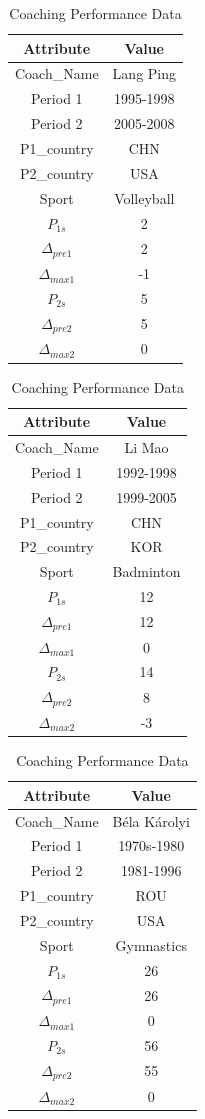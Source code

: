 \documentclass[12pt]{article}
\begin{document}
\begin{table}[h!]
\caption{Coaching Performance Data}
\centering
\begin{tabular}{|c|c|}
\hline
\textbf{Attribute} & \textbf{Value} \\
\hline
Coach\_Name & Lang Ping \\
Period 1 & 1995-1998 \\
Period 2 & 2005-2008 \\
P1\_country & CHN \\
P2\_country & USA \\
Sport & Volleyball \\
$P_{1s}$ & 2 \\
$\Delta_{pre1}$ & 2 \\
$\Delta_{max1}$ & -1 \\
$P_{2s}$ & 5 \\
$\Delta_{pre2}$ & 5 \\
$\Delta_{max2}$ & 0 \\
\hline
\end{tabular}
\quad
\begin{tabular}{|c|c|}
\hline
\textbf{Attribute} & \textbf{Value} \\
\hline
Coach\_Name & Li Mao \\
Period 1 & 1992-1998 \\
Period 2 & 1999-2005 \\
P1\_country & CHN \\
P2\_country & KOR \\
Sport & Badminton \\
$P_{1s}$ & 12 \\
$\Delta_{pre1}$ & 12 \\
$\Delta_{max1}$ & 0 \\
$P_{2s}$ & 14 \\
$\Delta_{pre2}$ & 8 \\
$\Delta_{max2}$ & -3 \\
\hline
\end{tabular}
\quad
\begin{tabular}{|c|c|}
\hline
\textbf{Attribute} & \textbf{Value} \\
\hline
Coach\_Name & Béla Károlyi \\
Period 1 & 1970s-1980 \\
Period 2 & 1981-1996 \\
P1\_country & ROU \\
P2\_country & USA \\
Sport & Gymnastics \\
$P_{1s}$ & 26 \\
$\Delta_{pre1}$ & 26 \\
$\Delta_{max1}$ & 0 \\
$P_{2s}$ & 56 \\
$\Delta_{pre2}$ & 55 \\
$\Delta_{max2}$ & 0 \\
\hline
\end{tabular}
\label{tab:coaching_data}
\end{table}
\end{document}
